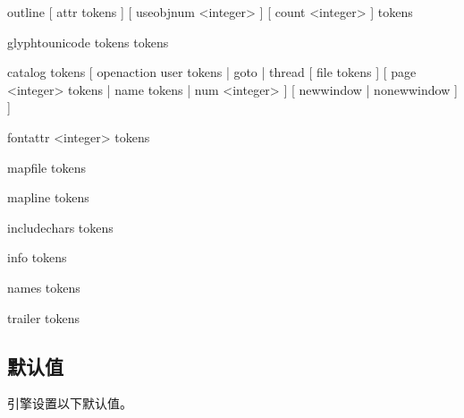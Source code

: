 \begin{typing}
\pdfextension outline
    [ attr { tokens } ]
    [ useobjnum <integer> ]
    [ count <integer> ]
    { tokens }
\end{typing}

\begin{typing}
\pdfextension glyphtounicode
    { tokens }
    { tokens }
\end{typing}

\begin{typing}
\pdfextension catalog
    { tokens }
    [ openaction
      user { tokens } | goto | thread
      [ file { tokens } ]
      [ page <integer> { tokens } | name { tokens } | num <integer> ]
      [ newwindow  | nonewwindow ] ]
\end{typing}

\begin{typing}
\pdfextension fontattr
    <integer>
    {tokens}
\end{typing}

\begin{typing}
\pdfextension mapfile
    {tokens}
\end{typing}

\begin{typing}
\pdfextension mapline
    {tokens}
\end{typing}

\begin{typing}
\pdfextension includechars
    {tokens}
\end{typing}

\begin{typing}
\pdfextension info
    {tokens}
\end{typing}

\begin{typing}
\pdfextension names
    {tokens}
\end{typing}

\begin{typing}
\pdfextension trailer
    {tokens}
\end{typing}

\subsection{默认值}

引擎设置以下默认值。

